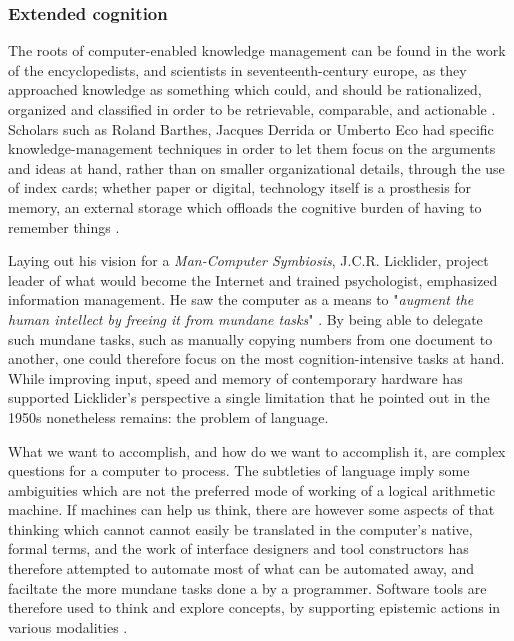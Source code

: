 \subsubsection{Extended cognition}
\label{subsubsec:extended-cognition}

The roots of computer-enabled knowledge management can be found in the work of the encyclopedists, and scientists in seventeenth-century europe, as they approached knowledge as something which could, and should be rationalized, organized and classified in order to be retrievable, comparable, and actionable \citep{sack_software_2019}. Scholars such as Roland Barthes, Jacques Derrida or Umberto Eco had specific knowledge-management techniques in order to let them focus on the arguments and ideas at hand, rather than on smaller organizational details, through the use of index cards; whether paper or digital, technology itself is a prosthesis for memory, an external storage which offloads the cognitive burden of having to remember things \citep{wilken_card_2010}.

Laying out his vision for a \emph{Man-Computer Symbiosis}, J.C.R. Licklider, project leader of what would become the Internet and trained psychologist, emphasized information management. He saw the computer as a means to "\emph{augment the human intellect by freeing it from mundane tasks}" \citep{licklider_mancomputer_1960}. By being able to delegate such mundane tasks, such as manually copying numbers from one document to another, one could therefore focus on the most cognition-intensive tasks at hand. While improving input, speed and memory of contemporary hardware has supported Licklider's perspective a single limitation that he pointed out in the 1950s nonetheless remains: the problem of language.

What we want to accomplish, and how do we want to accomplish it, are complex questions for a computer to process. The subtleties of language imply some ambiguities which are not the preferred mode of working of a logical arithmetic machine. If machines can help us think, there are however some aspects of that thinking which cannot cannot easily be translated in the computer's native, formal terms, and the work of interface designers and tool constructors has therefore attempted to automate most of what can be automated away, and faciltate the more mundane tasks done a by a programmer. Software tools are therefore used to think and explore concepts, by supporting epistemic actions in various modalities \citep{victor_humane_2014}.


